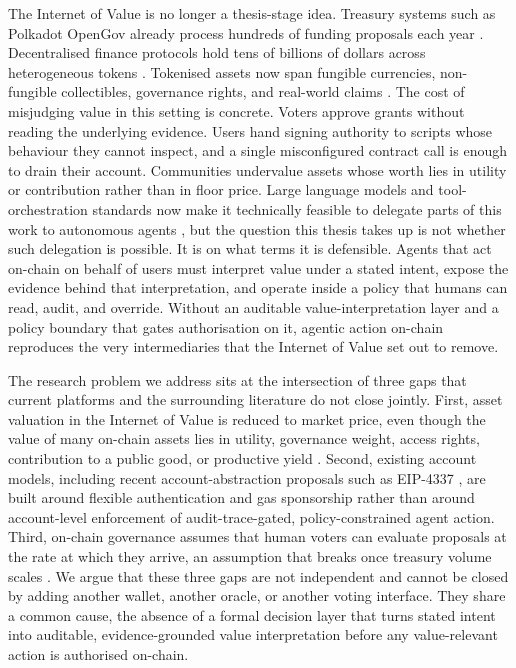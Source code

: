 The Internet of Value is no longer a thesis-stage idea. Treasury systems such as Polkadot OpenGov already process hundreds of funding proposals each year \cite{Valastin2024proto}. Decentralised finance protocols hold tens of billions of dollars across heterogeneous tokens \cite{Schar2021}. Tokenised assets now span fungible currencies, non-fungible collectibles, governance rights, and real-world claims \cite{Bambridge2022}. The cost of misjudging value in this setting is concrete. Voters approve grants without reading the underlying evidence. Users hand signing authority to scripts whose behaviour they cannot inspect, and a single misconfigured contract call is enough to drain their account. Communities undervalue assets whose worth lies in utility or contribution rather than in floor price. Large language models and tool-orchestration standards now make it technically feasible to delegate parts of this work to autonomous agents \cite{Sumers2024, Wu2023}, but the question this thesis takes up is not whether such delegation is possible. It is on what terms it is defensible. Agents that act on-chain on behalf of users must interpret value under a stated intent, expose the evidence behind that interpretation, and operate inside a policy that humans can read, audit, and override. Without an auditable value-interpretation layer and a policy boundary that gates authorisation on it, agentic action on-chain reproduces the very intermediaries that the Internet of Value set out to remove.

The research problem we address sits at the intersection of three gaps that current platforms and the surrounding literature do not close jointly. First, asset valuation in the Internet of Value is reduced to market price, even though the value of many on-chain assets lies in utility, governance weight, access rights, contribution to a public good, or productive yield \cite{Lohmer2024, Ante2021}. Second, existing account models, including recent account-abstraction proposals such as EIP-4337 \cite{Buterin2021, Wang2023, Duan2024}, are built around flexible authentication and gas sponsorship rather than around account-level enforcement of audit-trace-gated, policy-constrained agent action. Third, on-chain governance assumes that human voters can evaluate proposals at the rate at which they arrive, an assumption that breaks once treasury volume scales \cite{Valastin2024proto}. We argue that these three gaps are not independent and cannot be closed by adding another wallet, another oracle, or another voting interface. They share a common cause, the absence of a formal decision layer that turns stated intent into auditable, evidence-grounded value interpretation before any value-relevant action is authorised on-chain.


